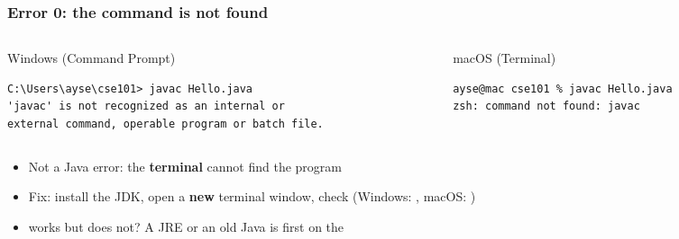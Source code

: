 \documentclass[aspectratio=169,10pt,compress]{beamer}
\begin{document}
\begin{frame}[t,fragile] \frametitle{Error 0: the command is not found}
  \begin{columns}[T]
    \begin{column}{0.48\textwidth}
      \begin{block}{Windows (Command Prompt)}


\begin{lstlisting}[style=codesnippet, language={}, basicstyle=\ttfamily\scriptsize]
C:\Users\ayse\cse101> javac Hello.java
'javac' is not recognized as an internal or
external command, operable program or batch file.
\end{lstlisting}


      \end{block}
    \end{column}
    \begin{column}{0.48\textwidth}
      \begin{block}{macOS (Terminal)}


\begin{lstlisting}[style=codesnippet, language=bash, basicstyle=\ttfamily\scriptsize]
ayse@mac cse101 % javac Hello.java
zsh: command not found: javac
\end{lstlisting}


      \end{block}
    \end{column}
  \end{columns}

  \vspace{0.3em}
  \begin{itemize}\small
    \item Not a Java error: the \textbf{terminal} cannot find the program
    \item Fix: install the JDK, open a \textbf{new} terminal window, check  (Windows: , macOS: )
    \item {} works but  does not? A JRE or an old Java is first on the 
  \end{itemize}
\end{frame}

\end{document}
